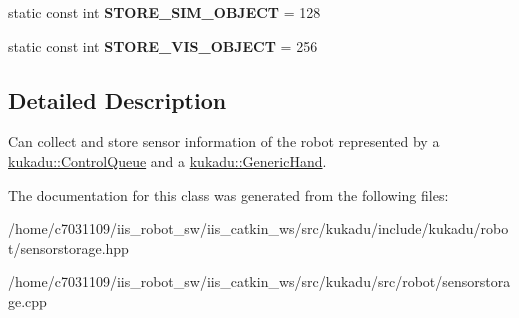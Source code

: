 \begin{DoxyCompactItemize}
\item 
\hypertarget{classkukadu_1_1SensorStorage_ad2b1ffec1c7466a22d0f4431ba987931}{static const int {\bfseries S\-T\-O\-R\-E\-\_\-\-S\-I\-M\-\_\-\-O\-B\-J\-E\-C\-T} = 128}\label{classkukadu_1_1SensorStorage_ad2b1ffec1c7466a22d0f4431ba987931}

\item 
\hypertarget{classkukadu_1_1SensorStorage_a041506263812ebe4d18bd0a7f780cef8}{static const int {\bfseries S\-T\-O\-R\-E\-\_\-\-V\-I\-S\-\_\-\-O\-B\-J\-E\-C\-T} = 256}\label{classkukadu_1_1SensorStorage_a041506263812ebe4d18bd0a7f780cef8}

\end{DoxyCompactItemize}


\subsection{Detailed Description}
Can collect and store sensor information of the robot represented by a \hyperlink{classkukadu_1_1ControlQueue}{kukadu\-::\-Control\-Queue} and a \hyperlink{classkukadu_1_1GenericHand}{kukadu\-::\-Generic\-Hand}. 

The documentation for this class was generated from the following files\-:\begin{DoxyCompactItemize}
\item 
/home/c7031109/iis\-\_\-robot\-\_\-sw/iis\-\_\-catkin\-\_\-ws/src/kukadu/include/kukadu/robot/sensorstorage.\-hpp\item 
/home/c7031109/iis\-\_\-robot\-\_\-sw/iis\-\_\-catkin\-\_\-ws/src/kukadu/src/robot/sensorstorage.\-cpp\end{DoxyCompactItemize}
